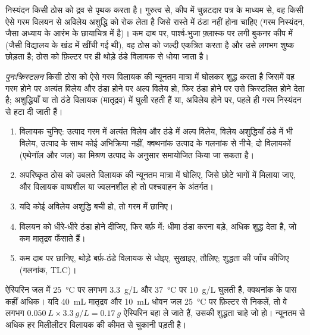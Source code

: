निस्यंदन किसी ठोस को द्रव से पृथक करता है। गुरुत्व से, कीप में
चुन्नटदार पत्र के माध्यम से, वह किसी ऐसे गरम विलयन से अविलेय अशुद्धि को रोक लेता है
जिसे रास्ते में ठंडा नहीं होना चाहिए (गरम निस्यंदन, जैसा अध्याय के आरंभ के
छायाचित्र में है)। कम दाब पर, पार्श्व-भुजा फ़्लास्क पर लगी बुकनर कीप में
(जैसी विद्यालय के खंड में खींची गई थी), वह ठोस को
जल्दी एकत्रित करता है और उसे लगभग शुष्क छोड़ता है; ठोस को फ़िल्टर पर ही
थोड़े ठंडे विलायक से धोया जाता है।

\begin{definition}[पुनःक्रिस्टलन]\label{def:b1:lab-techniques-1:recrystallisation}
\emph{पुनःक्रिस्टलन} किसी ठोस को
ऐसे गरम विलायक की न्यूनतम मात्रा में घोलकर शुद्ध करता है जिसमें वह गरम होने पर अत्यंत विलेय
और ठंडा होने पर अल्प विलेय हो, फिर ठंडा होने पर उसे क्रिस्टलित होने देता है; अशुद्धियाँ
या तो ठंडे विलायक (मातृद्रव) में घुली रहती हैं
या, अविलेय होने पर, पहले ही गरम निस्यंदन से हटा दी जाती हैं।
\end{definition}

\begin{method}[किसी ठोस का पुनःक्रिस्टलन]\label{met:b1:lab-techniques-1:recrystallise}
\begin{enumerate}
  \item विलायक चुनिए: उत्पाद गरम में अत्यंत विलेय और ठंडे में अल्प
        विलेय, विलेय अशुद्धियाँ ठंडे में भी विलेय, उत्पाद के साथ कोई
        अभिक्रिया नहीं, क्वथनांक उत्पाद के
        गलनांक से नीचे; दो  विलायकों (एथेनॉल और
        जल) का मिश्रण उत्पाद के अनुसार समायोजित किया जा सकता है।
  \item अपरिष्कृत ठोस को उबलते विलायक की न्यूनतम मात्रा में घोलिए, जिसे
        छोटे भागों में मिलाया जाए, और विलायक वाष्पशील या
        ज्वलनशील हो तो पश्चवाहन के अंतर्गत।
  \item यदि कोई अविलेय अशुद्धि बची हो, तो गरम में छानिए।
  \item विलयन को धीरे-धीरे ठंडा होने दीजिए, फिर बर्फ़ में: धीमा ठंडा करना
        बड़े, अधिक शुद्ध  देता है, जो कम मातृद्रव फँसाते हैं।
  \item कम दाब पर छानिए, थोड़े बर्फ़-ठंडे
        विलायक से धोइए, सुखाइए, तौलिए; शुद्धता की जाँच कीजिए (गलनांक, TLC)।
\end{enumerate}
\end{method}

\begin{example}[शुद्धता की कीमत]
ऐस्पिरिन जल में \qty{25}{\celsius} पर लगभग \qty{3.3}{g/L}
और \qty{37}{\celsius} पर \qty{10}{g/L} घुलती है, क्वथनांक के पास कहीं अधिक।
यदि \qty{40}{mL} मातृद्रव और \qty{10}{mL} धोवन जल
\qty{25}{\celsius} पर फ़िल्टर से निकलें, तो वे लगभग
$\qty{0.050}{L} \times \qty{3.3}{g/L} = \qty{0.17}{g}$ ऐस्पिरिन बहा ले जाते हैं, उसकी
शुद्धता चाहे जो हो। न्यूनतम से अधिक हर मिलीलीटर विलायक की कीमत  से चुकानी पड़ती है।
\end{example}

